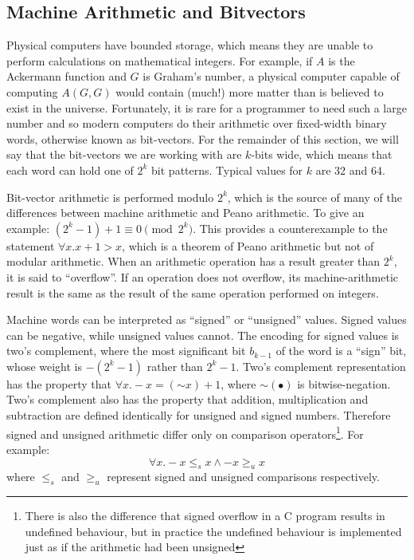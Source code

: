 \documentclass[preprint]{sigplanconf}
\theoremstyle{definition}
\begin{document}
\subsection{Machine Arithmetic and Bitvectors} \label{sec:machine.arith} 

Physical computers have bounded storage, which means they are unable to
perform calculations on mathematical integers.  For example, if $A$ is the
Ackermann function and $G$ is Graham's number, a physical computer capable
of computing $A(G, G)$ would contain (much!) more matter than is believed to
exist in the universe.  Fortunately, it is rare for a programmer to need
such a large number and so modern computers do their arithmetic over
fixed-width binary words, otherwise known as bit-vectors.  For the remainder
of this section, we will say that the bit-vectors we are working with are
$k$-bits wide, which means that each word can hold one of $2^k$ bit
patterns.  Typical values for $k$ are 32 and 64.

Bit-vector arithmetic is performed modulo $2^k$, which is the source of many
of the differences between machine arithmetic and Peano arithmetic.  To give
an example: $(2^k - 1) + 1 \equiv 0 \pmod {2^k}$.  This provides a
counterexample to the statement $\forall x .  x + 1 > x$, which is a theorem
of Peano arithmetic but not of modular arithmetic.  When an arithmetic
operation has a result greater than $2^k$, it is said to ``overflow''.  If
an operation does not overflow, its machine-arithmetic result is the same as
the result of the same operation performed on integers.

Machine words can be interpreted as ``signed'' or ``unsigned'' values. 
Signed values can be negative, while unsigned values cannot.  The encoding
for signed values is two's complement, where the most significant bit
$b_{k-1}$ of the word is a ``sign'' bit, whose weight is $-(2^k - 1)$ rather
than $2^k - 1$.  Two's complement representation has the property that
$\forall x .  -x = (\mathord{\sim} x) + 1$, where $\mathord{\sim}(\bullet)$
is bitwise-negation.  Two's complement also has the property that addition,
multiplication and subtraction are defined identically for unsigned and
signed numbers.  Therefore signed and unsigned arithmetic differ only on
comparison operators\footnote{There is also the difference that signed
overflow in a C program results in undefined behaviour, but in practice the
undefined behaviour is implemented just as if the arithmetic had been
unsigned}.  For example: $$\forall x .  -x \leq_s x \wedge -x \geq_u x$$
where $\leq_s$ and $\geq_u$ represent signed and unsigned comparisons
respectively.
\end{document}
